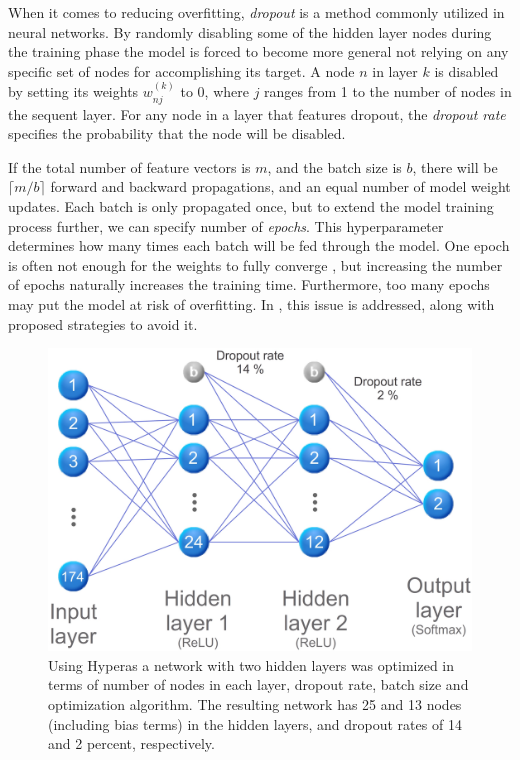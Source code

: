 When it comes to reducing overfitting, \emph{dropout} is a method commonly utilized in neural networks. By randomly disabling some of the hidden layer nodes during the training phase the model is forced to become more general not relying on any specific set of nodes for accomplishing its target. A node $n$ in layer $k$ is disabled by setting its weights $w^{(k)}_{nj}$ to 0, where $j$ ranges from 1 to the number of nodes in the sequent layer. For any node in a layer that features dropout, the \emph{dropout rate} specifies the probability that the node will be disabled.

If the total number of feature vectors is $m$, and the batch size is $b$, there will be $\lceil m/b \rceil$ forward and backward propagations, and an equal number of model weight updates. Each batch is only propagated once, but to extend the model training process further, we can specify number of \emph{epochs}. This hyperparameter determines how many times each batch will be fed through the model. One epoch is often not enough for the weights to fully converge \citep{kriesel_2007}, but increasing the number of epochs naturally increases the training time. Furthermore, too many epochs may put the model at risk of overfitting. In \citep{prechelt_2000}, this issue is addressed, along with proposed strategies to avoid it.

\begin{figure}[h]
	\centering
	\includegraphics[scale=0.5]{figs_temp/optimized_network_graph.jpg}
	\caption{Using Hyperas a network with two hidden layers was optimized in terms of number of nodes in each layer, dropout rate, batch size and optimization algorithm. The resulting network has 25 and 13 nodes (including bias terms) in the hidden layers, and dropout rates of 14 and 2 percent, respectively.}
	\label{fig:opt_net}
\end{figure}


